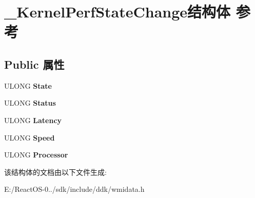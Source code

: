 \hypertarget{struct___kernel_perf_state_change}{}\section{\+\_\+\+Kernel\+Perf\+State\+Change结构体 参考}
\label{struct___kernel_perf_state_change}
\subsection*{Public 属性}
\begin{DoxyCompactItemize}
\item 
\mbox{\label{struct___kernel_perf_state_change_a4367ba90db44c5fdb8c16d95d4a43edc}} 
U\+L\+O\+NG {\bfseries State}
\item 
\mbox{\label{struct___kernel_perf_state_change_a3258911d73557208ffc1e7ef11fe075d}} 
U\+L\+O\+NG {\bfseries Status}
\item 
\mbox{\label{struct___kernel_perf_state_change_aa2105ddf23cfc59ca6851990fbc1d515}} 
U\+L\+O\+NG {\bfseries Latency}
\item 
\mbox{\label{struct___kernel_perf_state_change_a202a78958d656bba2f608ae4bad55612}} 
U\+L\+O\+NG {\bfseries Speed}
\item 
\mbox{\label{struct___kernel_perf_state_change_a369dd710ce4b1c93fddab3e6c1457aa1}} 
U\+L\+O\+NG {\bfseries Processor}
\end{DoxyCompactItemize}


该结构体的文档由以下文件生成\+:\begin{DoxyCompactItemize}
\item 
E\+:/\+React\+O\+S-\/0../sdk/include/ddk/wmidata.\+h\end{DoxyCompactItemize}
